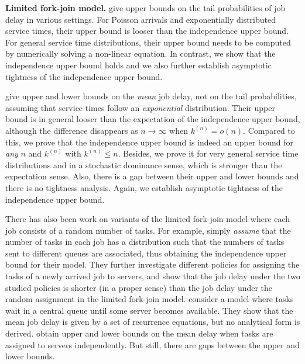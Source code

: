 \documentclass[sigconf]{acmart}
\newcommand{\supn}{^{(n)}}
\begin{document}
\textbf{Limited fork-join model.}
\citet{RizPolCiu_16} give upper bounds on the tail probabilities of job delay in various settings. For Poisson arrivals and exponentially distributed service times, their upper bound is looser than the independence upper bound.  For general service time distributions, their upper bound needs to be computed by numerically solving a non-linear equation.  In contrast, we show that the independence upper bound holds and we also further establish asymptotic tightness of the independence upper bound. 


\citet{LeeShaHua_17} give upper and lower bounds on the \emph{mean} job delay, not on the tail probabilities, assuming that service times follow an \emph{exponential} distribution.  Their upper bound is in general looser than the expectation of the independence upper bound, although the difference disappears as $n\to\infty$ when $k\supn=o(n)$.  Compared to this, we prove that the independence upper bound is indeed an upper bound for \emph{any} $n$ and $k\supn$ with $k\supn\le n$.  Besides, we prove it for very general service time distributions and in a stochastic dominance sense, which is stronger than the expectation sense.  Also, there is a gap between their upper and lower bounds and there is no tightness analysis.  Again, we establish asymptotic tightness of the independence upper bound.


There has also been work on variants of the limited fork-join model where each job consists of a random number of tasks. For example, \citet{ShaBouBac_17} simply \emph{assume} that the number of tasks in each job has a distribution such that the numbers of tasks sent to different queues are associated, thus obtaining the independence upper bound for their model. They further investigate different policies for assigning the tasks of a newly arrived job to servers, and show that the job delay under the two studied policies is shorter (in a proper sense) than the job delay under the random assignment in the limited fork-join model. \citet{NelTowTan_88} consider a model where tasks wait in a central queue until some server becomes available. They show that the mean job delay is given by a set of recurrence equations, but no analytical form is derived.  \citet{KumSho_93} obtain upper and lower bounds on the mean delay when tasks are assigned to servers independently.  But still, there are gaps between the upper and lower bounds.
\end{document}
